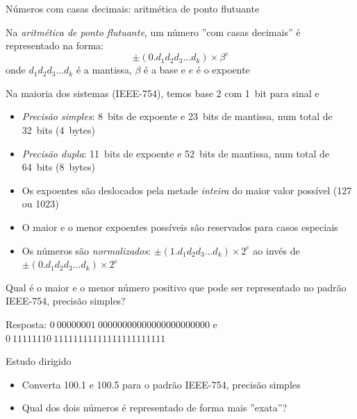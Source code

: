 \begin{frame}{Números com casas decimais: aritmética de ponto flutuante}
    \begin{tcolorbox}[colback=red!10]
        Na \textit{aritmética de ponto flutuante}, um número ''com casas decimais'' é representado
        na forma:
        \[
            \pm (0 . d_1 d_2 d_3 \ldots d_k) \times \beta^e
        \]
        onde \(d_ 1 d_2 d_3 \ldots d_k\) é a mantissa, \(\beta\) é a base e \(e\) é o expoente
    \end{tcolorbox}
    \pause
    Na maioria dos sistemas (IEEE-754), temos base 2 com \SI{1}{bit} para sinal e
    \begin{itemize}
        \item \textit{Precisão simples}: \SI{8}{bits} de expoente e \SI{23}{bits} de mantissa, num total de 
            \SI{32}{bits} (\SI{4}{bytes})
        \item \textit{Precisão dupla}: \SI{11}{bits} de expoente e \SI{52}{bits} de mantissa, num total de 
            \SI{64}{bits} (\SI{8}{bytes})
        \item Os expoentes são deslocados pela metade \textit{inteira} do maior
            valor possível (127 ou 1023)
        \item O maior e o menor expoentes possíveis são reservados para \alert{casos especiais}
        \item Os números são \textit{normalizados}: \( \pm (1 . d_1 d_2 d_3 \ldots d_k) \times 2^e\) 
            ao invés de \( \pm (0 . d_1 d_2 d_3 \ldots d_k) \times 2^e\)
    \end{itemize}
    \pause
    \begin{tcolorbox}[colback=blue!10]
        Qual é o maior e o menor número positivo que pode ser representado no padrão IEEE-754, precisão simples?

        \tiny{Resposta: \(0~00000001~0000 0000 0000 0000 0000 000\) e \(0~11111110~1111 1111 1111 11111 111 111\)}
    \end{tcolorbox}
\end{frame}

\begin{frame}{Estudo dirigido}
    \begin{itemize}
        \item Converta \num{100.1} e \num{100.5} para o padrão IEEE-754, precisão simples
        \item Qual dos dois números é representado de forma mais ''exata''?
    \end{itemize}
\end{frame}

